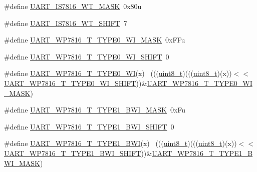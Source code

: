 \begin{DoxyCompactItemize}
\item 
\#define \hyperlink{group___u_a_r_t___register___masks_ga8f453ccf4624330f7b4e850238b029e3}{U\+A\+R\+T\+\_\+\+I\+S7816\+\_\+\+W\+T\+\_\+\+M\+A\+SK}~0x80u
\item 
\#define \hyperlink{group___u_a_r_t___register___masks_ga4d7a1e1c191f1d8114ccef43b758ebfd}{U\+A\+R\+T\+\_\+\+I\+S7816\+\_\+\+W\+T\+\_\+\+S\+H\+I\+FT}~7
\item 
\#define \hyperlink{group___u_a_r_t___register___masks_ga286b20da1c2d027adb43e13a29d0148b}{U\+A\+R\+T\+\_\+\+W\+P7816\+\_\+\+T\+\_\+\+T\+Y\+P\+E0\+\_\+\+W\+I\+\_\+\+M\+A\+SK}~0x\+F\+Fu
\item 
\#define \hyperlink{group___u_a_r_t___register___masks_ga2abd3cac45b65c8608d7acb2c985f56e}{U\+A\+R\+T\+\_\+\+W\+P7816\+\_\+\+T\+\_\+\+T\+Y\+P\+E0\+\_\+\+W\+I\+\_\+\+S\+H\+I\+FT}~0
\item 
\#define \hyperlink{group___u_a_r_t___register___masks_ga6c2b1961c4536e6ba685239be3470655}{U\+A\+R\+T\+\_\+\+W\+P7816\+\_\+\+T\+\_\+\+T\+Y\+P\+E0\+\_\+\+WI}(x)                            ~(((\hyperlink{_p_e___types_8h_aba7bc1797add20fe3efdf37ced1182c5}{uint8\+\_\+t})(((\hyperlink{_p_e___types_8h_aba7bc1797add20fe3efdf37ced1182c5}{uint8\+\_\+t})(x))$<$$<$\hyperlink{group___u_a_r_t___register___masks_ga2abd3cac45b65c8608d7acb2c985f56e}{U\+A\+R\+T\+\_\+\+W\+P7816\+\_\+\+T\+\_\+\+T\+Y\+P\+E0\+\_\+\+W\+I\+\_\+\+S\+H\+I\+FT}))\&\hyperlink{group___u_a_r_t___register___masks_ga286b20da1c2d027adb43e13a29d0148b}{U\+A\+R\+T\+\_\+\+W\+P7816\+\_\+\+T\+\_\+\+T\+Y\+P\+E0\+\_\+\+W\+I\+\_\+\+M\+A\+SK})
\item 
\#define \hyperlink{group___u_a_r_t___register___masks_gadb34493e13585c4acf5c3fba81e0e03f}{U\+A\+R\+T\+\_\+\+W\+P7816\+\_\+\+T\+\_\+\+T\+Y\+P\+E1\+\_\+\+B\+W\+I\+\_\+\+M\+A\+SK}~0x\+Fu
\item 
\#define \hyperlink{group___u_a_r_t___register___masks_ga23a788a5415cebd78a364d0578ee9b7c}{U\+A\+R\+T\+\_\+\+W\+P7816\+\_\+\+T\+\_\+\+T\+Y\+P\+E1\+\_\+\+B\+W\+I\+\_\+\+S\+H\+I\+FT}~0
\item 
\#define \hyperlink{group___u_a_r_t___register___masks_ga547c81de3a3c950139cb04577efa33f1}{U\+A\+R\+T\+\_\+\+W\+P7816\+\_\+\+T\+\_\+\+T\+Y\+P\+E1\+\_\+\+B\+WI}(x)                          ~(((\hyperlink{_p_e___types_8h_aba7bc1797add20fe3efdf37ced1182c5}{uint8\+\_\+t})(((\hyperlink{_p_e___types_8h_aba7bc1797add20fe3efdf37ced1182c5}{uint8\+\_\+t})(x))$<$$<$\hyperlink{group___u_a_r_t___register___masks_ga23a788a5415cebd78a364d0578ee9b7c}{U\+A\+R\+T\+\_\+\+W\+P7816\+\_\+\+T\+\_\+\+T\+Y\+P\+E1\+\_\+\+B\+W\+I\+\_\+\+S\+H\+I\+FT}))\&\hyperlink{group___u_a_r_t___register___masks_gadb34493e13585c4acf5c3fba81e0e03f}{U\+A\+R\+T\+\_\+\+W\+P7816\+\_\+\+T\+\_\+\+T\+Y\+P\+E1\+\_\+\+B\+W\+I\+\_\+\+M\+A\+SK})

\end{DoxyCompactItemize}
